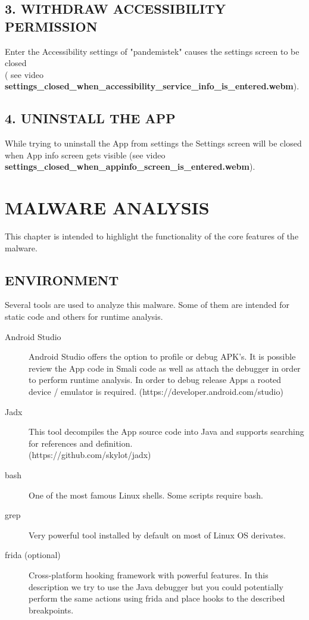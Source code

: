 \documentclass[10pt,titlepage]{article}
\begin{document}
\subsection{3. WITHDRAW ACCESSIBILITY PERMISSION}
Enter the Accessibility settings of "pandemistek" causes the settings screen to be closed 
\\  ( see video \textbf{settings\_closed\_when\_accessibility\_service\_info\_is\_entered.webm}).

\subsection{4. UNINSTALL THE APP}
While trying to uninstall the App from settings the Settings screen will be closed when App info screen gets visible (see video \textbf{settings\_closed\_when\_appinfo\_screen\_is\_entered.webm}).

\newpage
\section{MALWARE ANALYSIS}
This chapter is intended to highlight the functionality of the core features of the malware.

\subsection{ENVIRONMENT}
Several tools are used to analyze this malware. Some of them are intended for static code and others for runtime analysis.

\begin{description}
\item[Android Studio] Android Studio offers the option to profile or debug APK's. It is possible review the App code in Smali code as well as attach the debugger in order to perform runtime analysis. In order to debug release Apps a rooted device / emulator is required. (https://developer.android.com/studio)
\item[Jadx] This tool decompiles the App source code into Java and supports searching for references and definition. 
\\ (https://github.com/skylot/jadx)
\item[bash] One of the most famous Linux shells. Some scripts require bash.
\item[grep] Very powerful tool installed by default on most of Linux OS derivates.
\item[frida (optional)] Cross-platform hooking framework with powerful features. In this description we try to use the Java debugger but you could potentially perform the same actions using frida and place hooks to the described breakpoints.
\end{description}
\end{document}
